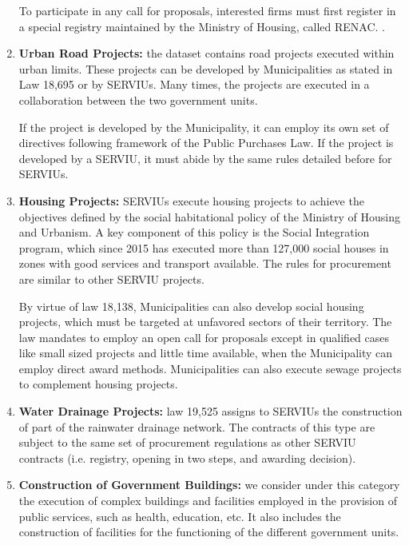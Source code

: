 \begin{enumerate}[wide, labelwidth=!,labelindent=0pt,label=\textbf{\arabic*}.]
To participate in any call for proposals, interested firms must first register in a special registry maintained by the Ministry of Housing, called RENAC. .

\item \textbf{Urban Road Projects:} the dataset contains road projects executed within urban limits. These projects can be developed by Municipalities as stated in Law 18,695 or by SERVIUs. Many times, the projects are executed in a collaboration between the two government units.

If the project is developed by the Municipality, it can employ its own set of directives following framework of the Public Purchases Law. If the project is developed by a SERVIU, it must abide by the same rules detailed before for SERVIUs.

\item \textbf{Housing Projects:} SERVIUs execute housing projects to achieve the objectives defined by the social habitational policy of the Ministry of Housing and Urbanism. A key component of this policy is the Social Integration program, which since 2015 has executed more than 127,000 social houses in zones with good services and transport available. The rules for procurement are similar to other SERVIU projects.

By virtue of law 18,138, Municipalities can also develop social housing projects, which must be targeted at unfavored sectors of their territory. The law mandates to employ an open call for proposals except in qualified cases like small sized projects and little time available, when the Municipality can employ direct award methods. Municipalities can also execute sewage projects to complement housing projects.

\item \textbf{Water Drainage Projects:} law 19,525 assigns to SERVIUs the construction of part of the rainwater drainage network. The contracts of this type are subject to the same set of procurement regulations as other SERVIU contracts (i.e. registry, opening in two steps, and awarding decision).

\item \textbf{Construction of Government Buildings:} we consider under this category the execution of complex buildings and facilities employed in the provision of public services, such as health, education, etc. It also includes the construction of facilities for the functioning of the different government units.


\end{enumerate}
